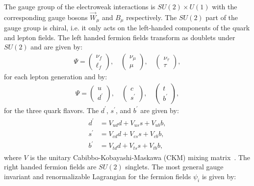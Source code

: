 The gauge group of the electroweak interactions is $SU(2) \times U(1)$ with the corresponding gauge bosons $\vec{W}_{\mu}$ and $B_{\mu}$ respectively. The $SU(2)$ part of the gauge group is chiral, i.e. it only acts on the left-handed components of the quark and lepton fields. The left handed fermion fields transform as doublets under $SU(2)$ and are given by:
\begin{eqnarray} \label{eq:doublet}
\Psi  = \left(\begin{array}{c} \nu_{f}\\ \ell_{f} \end{array} \right)\mathrm{,}  \quad \left(\begin{array}{c} \nu_{\mu}\\ \mu \end{array} \right)\mathrm{,}   \quad \left(\begin{array}{c} \nu_{\tau}\\ \tau \end{array} \right),
\end{eqnarray}   
for each lepton generation and by:
\begin{eqnarray} \label{eq:doublet_quark}
\Psi  = \left(\begin{array}{c} u \\ d^{'} \end{array} \right)\mathrm{,}  \quad \left(\begin{array}{c} c\\ s^{'} \end{array} \right)\mathrm{,}   \quad \left(\begin{array}{c} t\\ b^{'} \end{array} \right),
\end{eqnarray}   
for the three quark flavors. The $d^{'}$, $s^{'}$, and $b^{'}$ are given by:
\begin{eqnarray} \label{eq:ckm}
\begin{aligned}
d^{'} &= V_{ud}d + V_{us}s + V_{ub}b, \\
s^{'} &= V_{cd}d + V_{cs}s + V_{cb}b, \\
b^{'} &= V_{td}d + V_{ts}s + V_{tb}b, 
\end{aligned}
\end{eqnarray}   
where $V$ is the unitary Cabibbo-Kobayashi-Maskawa (CKM) mixing matrix~\cite{Cabibbo:1963yz,Kobayashi:1973fv}. The right handed fermion fields are $SU(2)$ singlets. The most general gauge invariant and renormalizable Lagrangian for the fermion fields $\psi_{i}$ is given by:
